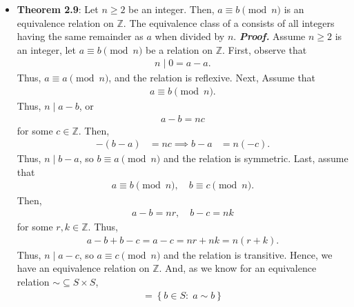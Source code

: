 \documentclass{report}
\begin{document}
\begin{itemize}
\begin{align*}
                a &\equiv r \pmod{n}, \\
                b &\equiv r \pmod{n}
            .\end{align*}
        \item \textbf{Theorem 2.9}: Let $n \geq 2$ be an integer. Then, $a \equiv b\pmod{n}$ is an equivalence relation on $\mathbb{Z}$. The equivalence class of a consists of all integers having the same remainder as $a$ when divided by $n$.
            \bigbreak \noindent 
            \textbf{\textit{Proof.}} Assume $n \geq 2$ is an integer, let $ a\equiv b \pmod{n}$ be a relation on $ \mathbb{Z}$. First, observe that 
            \begin{align*}
                n \mid 0 = a-a
            .\end{align*}
            Thus, $a \equiv a \pmod{n}$, and the relation is reflexive. Next, Assume that
            \begin{align*}
                a \equiv b \pmod{n}
            .\end{align*}
            Thus, $n \mid a-b$, or 
            \begin{align*}
                a-b = nc
            \end{align*}
            for some $c \in \mathbb{Z}$. Then,
            \begin{align*}
                -(b-a) &= nc \implies b-a &= n(-c)
            .\end{align*}
            Thus, $n \mid b-a$, so $b \equiv a \pmod{n}$ and the relation is symmetric. Last, assume that
            \begin{align*}
                a \equiv b \pmod{n}, \quad b \equiv c \pmod{n}
            .\end{align*}
            Then, 
            \begin{align*}
                a - b = nr, \quad b - c = nk
            \end{align*}
            for some $r,k \in \mathbb{Z}$. Thus,
            \begin{align*}
                a - b + b - c = a - c = nr + nk  = n(r+k)
            .\end{align*}
            Thus, $n \mid a-c$, so $a \equiv c \pmod{n}$ and the relation is transitive. Hence, we have an equivalence relation on $\mathbb{Z}$.
            \bigbreak \noindent 
            And, as we know for an equivalence relation $\sim \subseteq S \times S$, 
            \begin{align*}
                [a] = \left\{b \in S:\; a \sim b\right\} 

\end{align*}
\end{itemize}
\end{document}
